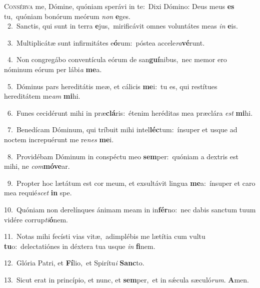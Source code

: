 \lettrine{\initial\textcolor{\initialcolor}{C}}{onsérva} me, Dómine, quóniam sperávi in te:~\dagger Dixi Dómino: Deus meus \textbf{es} tu,~\star quóniam bonórum meórum \textit{non} \textbf{e}\-ges.\\
{\numbfont\textcolor{\numbcolor}{~2.}}~Sanctis, qui sunt in terra \textbf{e}\-jus,~\star mirificávit omnes voluntátes meas \textit{in} \textbf{e}\-is.\par
{\numbfont\textcolor{\numbcolor}{~3.}}~Multiplicátæ sunt infirmitátes e\-\textbf{ó}\-rum:~\star póstea accele\-\textit{ra}\-\textbf{vé}runt.\par
{\numbfont\textcolor{\numbcolor}{~4.}}~Non congregábo conventícula eórum de san\-\textbf{guí}\-nibus,~\star nec memor ero nóminum eórum per lábi\textit{a} \textbf{me}\-a.\par
{\numbfont\textcolor{\numbcolor}{~5.}}~Dóminus pars hereditátis meæ, et cálicis \textbf{me}\-i:~\star tu es, qui restítues hereditátem me\textit{am} \textbf{mi}\-hi.\par
{\numbfont\textcolor{\numbcolor}{~6.}}~Funes cecidérunt mihi in præ\-\textbf{clá}\-ris:~\star étenim heréditas mea præclára \textit{est} \textbf{mi}\-hi.\par
{\numbfont\textcolor{\numbcolor}{~7.}}~Benedícam Dóminum, qui tríbuit mihi intel\-\textbf{léc}\-tum:~\star ínsuper et usque ad noctem increpuérunt me re\textit{nes} \textbf{me}\-i.\par
{\numbfont\textcolor{\numbcolor}{~8.}}~Providébam Dóminum in conspéctu meo \textbf{sem}\-per:~\star quóniam a dextris est mihi, ne \textit{com}\-\textbf{mó}\textbf{ve}ar.\par
{\numbfont\textcolor{\numbcolor}{~9.}}~Propter hoc lætátum est cor meum, et exsultávit lingua \textbf{me}\-a:~\star ínsuper et caro mea requié\textit{scet} \textbf{in} spe.\par
{\numbfont\textcolor{\numbcolor}{10.}}~Quóniam non derelínques ánimam meam in in\-\textbf{fér}\-no:~\star nec dabis sanctum tuum vidére corrup\-\textit{ti}\-\textbf{ó}nem.\par
{\numbfont\textcolor{\numbcolor}{11.}}~Notas mihi fecísti vias vitæ,~\dagger adimplébis me lætítia cum vultu \textbf{tu}\-o:~\star delectatiónes in déxtera tua usque \textit{in} \textbf{fi}\-nem.\par
{\numbfont\textcolor{\numbcolor}{12.}}~Glória Patri, et \textbf{Fí}\-lio,~\star et Spirítu\textit{i} \textbf{Sanc}\-to.\par
{\numbfont\textcolor{\numbcolor}{13.}}~Sicut erat in princípio, et nunc, et \textbf{sem}\-per,~\star et in sǽcula sæculó\-\textit{rum}\-. \textbf{A}\-men.\par
